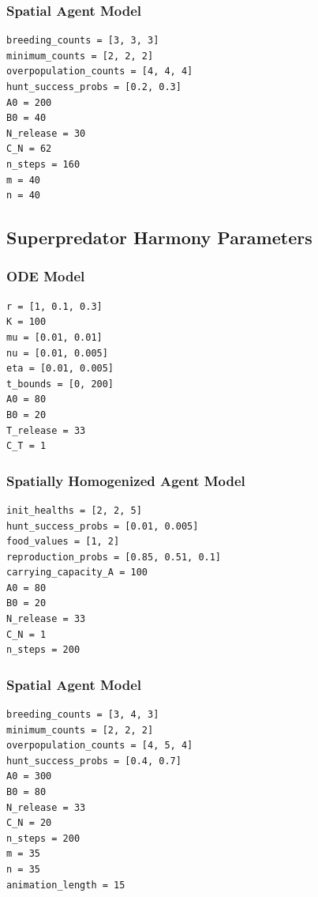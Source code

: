 \documentclass[journal]{IEEEtran}
\begin{document}
\subsubsection{Spatial Agent Model}
\begin{verbatim}
breeding_counts = [3, 3, 3]
minimum_counts = [2, 2, 2]
overpopulation_counts = [4, 4, 4]
hunt_success_probs = [0.2, 0.3]
A0 = 200
B0 = 40
N_release = 30
C_N = 62
n_steps = 160
m = 40
n = 40
\end{verbatim}

\subsection{Superpredator Harmony Parameters}
\subsubsection{ODE Model}
\begin{verbatim}
r = [1, 0.1, 0.3]
K = 100
mu = [0.01, 0.01]
nu = [0.01, 0.005]
eta = [0.01, 0.005]
t_bounds = [0, 200]
A0 = 80
B0 = 20
T_release = 33
C_T = 1
\end{verbatim}
\subsubsection{Spatially Homogenized Agent Model}
\begin{verbatim}
init_healths = [2, 2, 5]
hunt_success_probs = [0.01, 0.005]
food_values = [1, 2]
reproduction_probs = [0.85, 0.51, 0.1]
carrying_capacity_A = 100
A0 = 80
B0 = 20
N_release = 33
C_N = 1
n_steps = 200
\end{verbatim}
\subsubsection{Spatial Agent Model}
\begin{verbatim}
breeding_counts = [3, 4, 3]
minimum_counts = [2, 2, 2]
overpopulation_counts = [4, 5, 4]
hunt_success_probs = [0.4, 0.7]
A0 = 300
B0 = 80
N_release = 33
C_N = 20
n_steps = 200
m = 35
n = 35
animation_length = 15
\end{verbatim}
\end{document}
